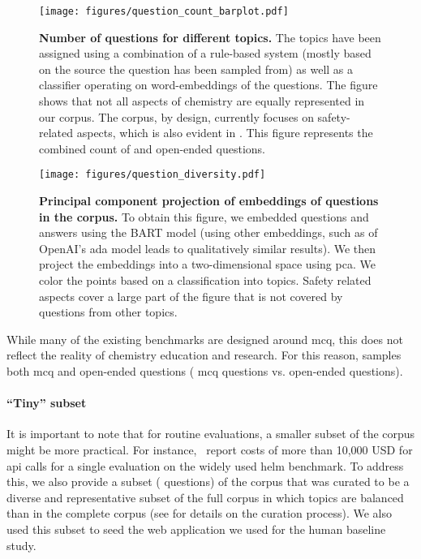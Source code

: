 \documentclass[11pt, oneside]{article}
\begin{document}
\begin{refsection}
\begin{figure}[!htb]
    \centering
    \texttt{[image: figures/question\_count\_barplot.pdf]}
    \caption{\textbf{Number of questions for different topics.} The topics have been assigned using a combination of a rule-based system (mostly based on the source the question has been sampled from) as well as a classifier operating on word-embeddings of the questions. 
    The figure shows that not all aspects of chemistry are equally represented in our corpus. The \chembench corpus, by design, currently focuses on safety-related aspects, which is also evident in . This figure represents the combined count of  and open-ended questions.}
    \label{fig:topic_barplot}
\end{figure}

\begin{figure}[!htb]
    \centering
    \texttt{[image: figures/question\_diversity.pdf]}
    \caption{\textbf{Principal component projection of embeddings of questions in the \chembench corpus.} To obtain this figure, we embedded questions and answers using the BART model\autocite{bart} (using other embeddings, such as of OpenAI's ada model leads to qualitatively similar results). We then project the embeddings into a two-dimensional space using \gls{pca}. We color the points based on a classification into topics. Safety related aspects cover a large part of the figure that is not covered by questions from other topics.}
    \label{fig:question_diversity}
\end{figure}

While many of the existing benchmarks are designed around \gls{mcq}, this does not reflect the reality of chemistry education and research.
For this reason, \chembench samples both \gls{mcq} and open-ended questions ( \gls{mcq} questions vs.  open-ended questions).


\paragraph{\enquote{Tiny} subset}
It is important to note that for routine evaluations, a smaller subset of the corpus might be more practical.\autocite{polo2024tinybenchmarks}
For instance,~\textcite{liang2023holistic} report costs of more than 10,000 USD for \gls{api} calls for a single evaluation on the widely used \gls{helm} benchmark. 
To address this, we also provide a subset ( questions) of the corpus that was curated to be a diverse and representative subset of the full corpus in which topics are balanced than in the complete corpus (see  for details on the curation process).
We also used this subset to seed the web application we used for the human baseline study. 



\end{refsection}
\end{document}
